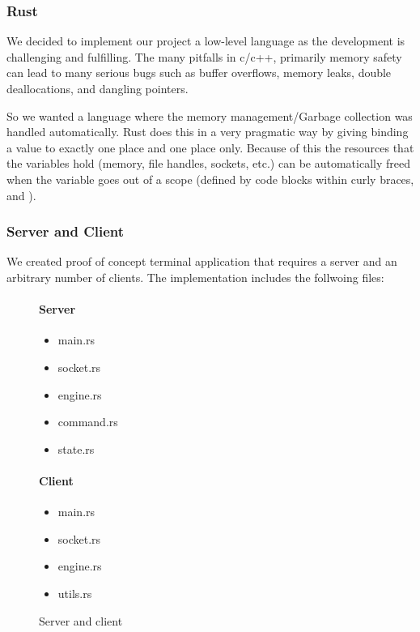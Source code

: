 



\subsubsection{Rust}
We decided to implement our project a low-level language as the
development is challenging and fulfilling. The many pitfalls in c/c++,
primarily memory safety can lead to many serious bugs such as buffer
overflows, memory leaks, double deallocations, and dangling pointers.

So we wanted a language where the memory management/Garbage collection
was handled automatically. Rust does this in a very pragmatic way by
giving binding a value to exactly one place and one place
only. Because of this the resources that the variables hold (memory,
file handles, sockets, etc.) can be automatically freed when the
variable goes out of a scope (defined by code blocks within curly
braces, { and }).

\subsubsection{Server and Client}
We created proof of concept terminal application that requires a
server and an arbitrary number of clients. The implementation includes
the follwoing files:
\begin{figure}[h]
  \begin{minipage}{0.5\textwidth}
    \paragraph{Server}
    \begin{itemize}
      \item main.rs
      \item socket.rs
      \item engine.rs
      \item command.rs
      \item state.rs
    \end{itemize}
  \end{minipage} \hfill
  \begin{minipage}{0.5\textwidth}
    \paragraph{Client}
    \begin{itemize}
      \item main.rs
      \item socket.rs
      \item engine.rs
      \item utils.rs
    \end{itemize}
  \end{minipage} \vfill
  \caption{Server and client}
\end{figure}

